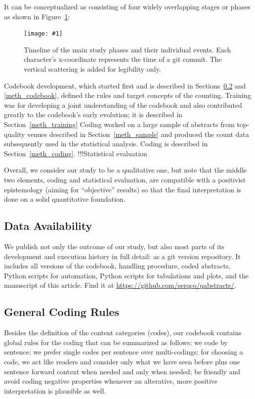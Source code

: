 \documentclass[10pt,journal,compsoc]{IEEEtran}
\newcommand{\Plot}[2]{%
	\begin{figure}[htb]%
		\centering\texttt{[image: \#1]}%
		\vspace{-4mm}\caption{#2}\label{#1}%
	\end{figure}}
\begin{document}
It can be conceptualized as consisting of four widely overlapping stages or phases
as shown in Figure~\ref{qabstracts_timeline_commits}:
%
\Plot{qabstracts_timeline_commits}{%
	Timeline of the main study phases and their individual events.
    Each character's x-coordinate represents the time of a git commit.
    The vertical scattering is added for legibility only.}
%
Codebook development, which started first and is described in Sections~\ref{meth_codingrules}
and \ref{meth_codebook},
defined the rules and target concepts of the counting.
Training was for developing a joint understanding of the codebook and also contributed
greatly to the codebook's early evolution;
it is described in Section~\ref{meth_training}
Coding worked on a large sample of abstracts from top-quality venues described in
Section~\ref{meth_sample} and produced the count data subsequently used in the statistical analysis.
Coding is described in Section~\ref{meth_coding}.
!!!Statistical evaluation

Overall, we consider our study to be a qualitative one, but note that the middle two elements,
coding and statistical evaluation,
are compatible with a positivist epistemology (aiming for ``objective'' results) so that
the final interpretation is done on a solid quantitative foundation.


\subsection{Data Availability}\label{dataavailability}

We publish not only the outcome of our study, but also most parts of its development and
execution history in full detail: as a git version repository.
It includes all versions of the
codebook, handling procedure, coded abstracts, Python scripts for automation,
Python scripts for tabulations and plots, and the manuscript of this article.
Find it at \url{https://github.com/serqco/qabstracts/}.


\subsection{General Coding Rules}\label{meth_codingrules}

Besides the definition of the content categories (codes),
our codebook contains global rules for the coding that can be summarized as follows:
we code by sentence;
we prefer single codes per sentence over multi-codings;
for choosing a code, we act like readers and consider only what we have seen before plus
one sentence forward context when needed and only when needed;
be friendly and avoid coding negative properties whenever an alterative, more positive
interpretation is plausible as well.
\end{document}
